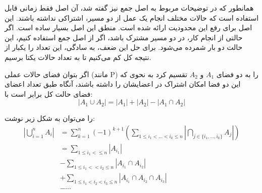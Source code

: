 \documentclass[
    11pt,
    largemargins,
    twoside,
    template_root=../,
    reference_icons=./Icons,
]{../BOOK}
\begin{document}

    \TOC


            \p
            همانطور که در توضیحات مربوط به اصل جمع نیز گفته شد، آن اصل
            فقط زمانی قابل استفاده است که حالات مختلف انجام یک عمل از دو مسیر،
            اشتراکی نداشته باشند. این اصل برای رفع این محدودیت ارائه شده است.
            منطق این اصل بسیار ساده است. اگر حالتی از انجام کار، در دو مسیر مشترک باشد،
            اگر از اصل جمع استفاده کنیم، این حالت دو بار شمرده می‌شود. برای حل این ضعف،
            به سادگی، این تعداد را یکبار از نتیجه کل کم می‌کنیم تا به تعداد حالات یکتا برسیم.

            \begin{DEFINITION}
                \p
                اگر بتوان فضای حالات عملی
                (مانند P)
                را به دو فضای
                $A_1$
                و
                $A_2$
                تقسیم کرد به نحوی که این دو فضا امکان اشتراک در اعضایشان را داشته باشند،
                آنگاه طبق  تعداد اعضای فضای حالت کل برابر است با:
                $$|A_1 \cup	A_2| = |A_1| + |A_2| - |A_1 \cap A_2|$$
            \end{DEFINITION}


            \begin{THEOREM}
                \p
                را می‌توان به شکل زیر نوشت:
                \begin{align*}
                    |\bigcup\limits_{i=1}^n A_i| &= \sum\limits_{k=1}^n (-1)^{k+1} (\sum\limits_{1 \leq i_1 < \dots < i_k \leq n} |\bigcap\limits_{j \in \{i_1,...,i_k\}} A_j|) \\
                    &= \sum\limits_{1 \leq i_1 < \leq n} |A_{i_1}| \\
                    &- \sum\limits_{1 \leq i_1 < < i_2 \leq n} |A_{i_1} \cap A_{i_2}| \\
                    &+ \sum\limits_{1 \leq i_1 < i_2 < i_3 \leq n} |A_{i_1} \cap A_{i_2} \cap A_{i_3}| \\
                    &- \cdots
                \end{align*}
            \end{THEOREM}
\end{document}
